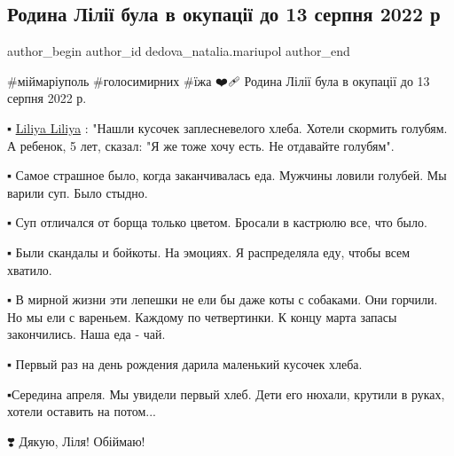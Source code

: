  
 
 
 
 

\subsection{Родина Лілії була в окупації до 13 серпня 2022 р}
\label{sec:27_01_2023.fb.dedova_natalia.mariupol.2.rodina_l_l__bula_v_}

\ifcmt
 author_begin
   author_id dedova_natalia.mariupol
 author_end
\fi

\#міймаріуполь
\#голосимирних
\#їжа
❤️🩹 Родина Лілії була в окупації до 13 серпня 2022 р. 

▪️ \href{https://www.facebook.com/liliya.dmitrishena}{Liliya Liliya} : "Нашли кусочек заплесневелого хлеба. Хотели скормить голубям.
А ребенок, 5 лет, сказал: "Я же тоже хочу есть. Не отдавайте голубям". 

▪️ Самое страшное было, когда заканчивалась еда. Мужчины ловили голубей. Мы
варили суп. Было стыдно. 

▪️ Суп отличался от борща только цветом. Бросали в кастрюлю все, что было. 

▪️ Были скандалы и бойкоты. На эмоциях. Я распределяла еду, чтобы всем хватило. 

▪️ В мирной жизни эти лепешки не ели бы даже коты с собаками. Они горчили. Но мы
ели с вареньем. Каждому по четвертинки. К концу марта запасы закончились. Наша
еда - чай. 

▪️ Первый раз на день рождения дарила маленький кусочек хлеба.

▪️Середина апреля. Мы увидели первый хлеб. Дети его нюхали, крутили в руках,
хотели оставить на потом... 

❣️ Дякую, Ліля! Обіймаю!
